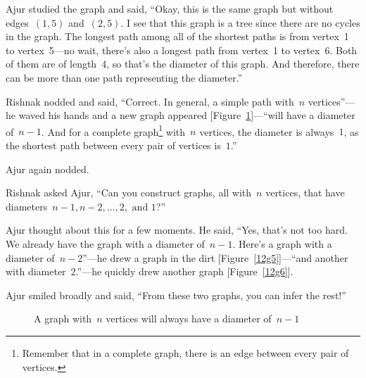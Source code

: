 Ajur studied the graph and said, ``Okay, this is the same graph but without edges~$(1,5)$ and~$(2,5)$. I see that this graph is a tree since there are no cycles in the graph. The longest path among all of the shortest paths is from vertex~1 to vertex~5---no wait, there's also a longest path from vertex~1 to vertex~6. Both of them are of length~4, so that's the diameter of this graph.  And therefore, there can be more than one path representing the diameter.''

Rishnak nodded and said, ``Correct. In general, a simple path with~$n$ vertices''---he waved his hands and a new graph appeared [Figure~\ref{12g4}]---``will have a diameter of~$n-1$. And for a complete graph\footnote{Remember that in a complete graph, there is an edge between every pair of vertices.} with~$n$ vertices, the diameter is always~$1$, as the shortest path between every pair of vertices is~$1$.''

Ajur again nodded.

Rishnak asked Ajur, ``Can you construct graphs, all with~$n$ vertices, that have diameters~$n-1,n-2,\ldots,2,\text{ and }1$?''

Ajur thought about this for a few moments. He said, ``Yes, that's not too hard. We already have the graph with a diameter of~$n-1$. Here's a graph with a diameter of~$n-2$''---he drew a graph in the dirt [Figure~\ref{12g5}]---``and another with diameter~$2$.''---he quickly drew another graph [Figure~\ref{12g6}].

Ajur smiled broadly and said, ``From these two graphs, you can infer the rest!''

\begin{figure}
\begin{center}
\caption{A graph with~$n$ vertices will always have a diameter of~$n-1$}\label{12g4}
\end{center}
\end{figure}

